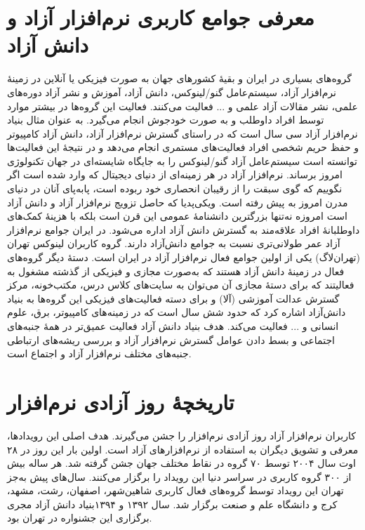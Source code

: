 \documentclass{article}
\begin{document}
\section{معرفی جوامع کاربری نرم‌افزار آزاد و دانش آزاد}
گروه‌های بسیاری در ایران و بقیهٔ کشورهای جهان به صورت فیزیکی یا آنلاین در زمینهٔ نرم‌افزار آزاد، سیستم‌عامل‌ گنو/لینوکس، دانش آزاد، آموزش و نشر آزاد دوره‌های علمی، نشر مقالات آزاد علمی و ... فعالیت می‌کنند. فعالیت این گروه‌ها در بیشتر موارد توسط افراد داوطلب و به صورت خودجوش انجام می‌گیرد.
به عنوان مثال بنیاد نرم‌افزار آزاد سی سال است که در راستای گسترش نرم‌افزار آزاد، دانش آزاد کامپیوتر و حفظ حریم شخصی افراد فعالیت‌های مستمری انجام می‌دهد و در نتیجهٔ این فعالیت‌ها توانسته است سیستم‌عامل آزاد گنو/لینوکس را به جایگاه شایسته‌ای در جهان تکنولوژی امروز برساند. نرم‌افزار آزاد در هر زمینه‌ای از دنیای دیجیتال که وارد شده است اگر نگوییم که گوی سبقت را از رقیبان انحصاری خود ربوده است، پابه‌پای آنان در دنیای مدرن امروز به پیش رفته است.
ویکی‌پدیا که حاصل تزویج نرم‌افزار آزاد و دانش آزاد است امروزه نه‌تنها بزرگترین دانشنامهٔ عمومی این قرن است بلکه با هزینهٔ کمک‌های داوطلبانهٔ افراد علاقه‌مند به گسترش دانش آزاد اداره می‌شود. در ایران جوامع نرم‌افزار آزاد عمر طولانی‌تری نسبت به جوامع دانش‌آزاد دارند. گروه کاربران لینوکس تهران (تهران‌لاگ) یکی از اولین جوامع فعال نرم‌افزار آزاد در ایران است. دستهٔ دیگر گروه‌های فعال در زمینهٔ دانش آزاد هستند که به‌صورت مجازی و فیزیکی از گذشته مشغول به فعالیتند که برای دستهٔ مجازی آن می‌توان به سایت‌های کلاس درس، مکتب‌خونه،‌ مرکز گسترش عدالت آموزشی (آلا) و برای دسته فعالیت‌های فیزیکی این گروه‌ها به بنیاد دانش‌آزاد اشاره کرد که حدود شش سال است که در زمینه‌های کامپیوتر، برق، علوم انسانی و ... فعالیت می‌کند. هدف بنیاد دانش آزاد فعالیت عمیق‌تر در همهٔ جنبه‌‌های اجتماعی و بسط دادن عوامل گسترش نرم‌افزار آزاد و بررسی ریشه‌‌های ارتباطی جنبه‌های مختلف نرم‌افزار آزاد و اجتماع است.

\section{تاریخچهٔ روز آزادی نرم‌افزار}
کاربران نرم‌افزار آزاد روز آزادی نرم‌افزار را جشن می‌گیرند. هدف اصلی این رویدادها، معرفی و تشویق دیگران به استفاده از نرم‌افزارهای آزاد است.
اولین بار این روز در ۲۸ اوت سال ۲۰۰۴ توسط ۷۰ گروه در نقاط مختلف جهان جشن گرفته شد. هر ساله بیش از ۳۰۰ گروه کاربری در سراسر دنیا این رویداد را برگزار می‌کنند. سال‌های پیش به‌جز تهران این رویداد توسط گروه‌های فعال کاربری شاهین‌شهر، اصفهان، رشت، مشهد، کرج و دانشگاه علم و صنعت برگزار شد. سال ۱۳۹۲ و ۱۳۹۴بنیاد دانش آزاد مجری برگزاری این جشنواره در تهران بود.
\end{document}
